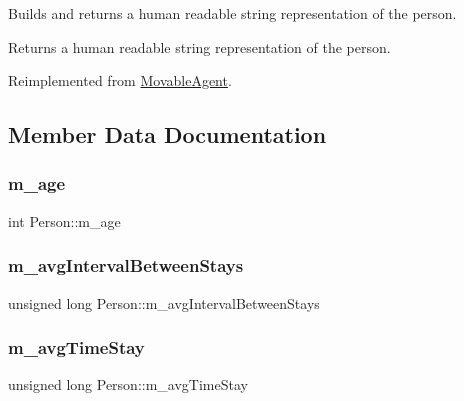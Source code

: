 Builds and returns a human readable string representation of the person. \begin{DoxyReturn}{Returns}
a human readable string representation of the person. 
\end{DoxyReturn}


Reimplemented from \mbox{\hyperlink{class_movable_agent_a1dee2a6bf93f01006fadfb6fba6c9a59}{Movable\+Agent}}.



\subsection{Member Data Documentation}
\mbox{\label{class_person_a743e071da10a5ac9150f61df919cfbb4}} 
\subsubsection{\texorpdfstring{m\_age}{m\_age}}
{\footnotesize\ttfamily int Person\+::m\+\_\+age\hspace{0.3cm}{\ttfamily [private]}}

\mbox{\label{class_person_a62a07c9565931a618a09be7510dde07c}} 
\subsubsection{\texorpdfstring{m\_avgIntervalBetweenStays}{m\_avgIntervalBetweenStays}}
{\footnotesize\ttfamily unsigned long Person\+::m\+\_\+avg\+Interval\+Between\+Stays\hspace{0.3cm}{\ttfamily [private]}}

\mbox{\label{class_person_a8c9502459dd59182d11f60f429b44457}} 
\subsubsection{\texorpdfstring{m\_avgTimeStay}{m\_avgTimeStay}}
{\footnotesize\ttfamily unsigned long Person\+::m\+\_\+avg\+Time\+Stay\hspace{0.3cm}{\ttfamily [private]}}

